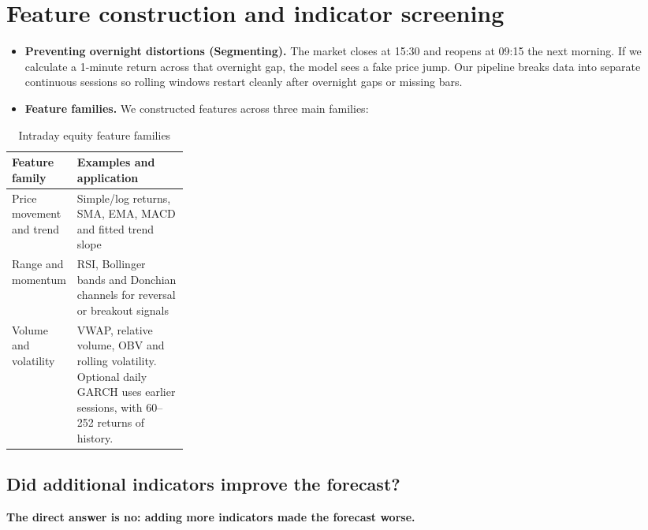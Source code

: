 \documentclass[12pt,a4paper,twoside,openany]{report}
\begin{document}
\section{Feature construction and indicator screening}\label{exp:5}
\begin{itemize}
  \item \textbf{Preventing overnight distortions (Segmenting).} The market closes at 15:30 and reopens at 09:15 the next morning. If we calculate a 1-minute return across that overnight gap, the model sees a fake price jump. Our pipeline breaks data into separate continuous sessions so rolling windows restart cleanly after overnight gaps or missing bars.
  \item \textbf{Feature families.} We constructed features across three main families:
\end{itemize}

\begin{table}[htbp]\centering\singlespacing
\caption{Intraday equity feature families}
\begin{tabularx}{\linewidth}{@{}p{0.26\linewidth}X@{}}\toprule
Feature family & Examples and application\\\midrule
Price movement and trend & Simple/log returns, SMA, EMA, MACD and fitted trend slope\\
Range and momentum & RSI, Bollinger bands and Donchian channels for reversal or breakout signals\\
Volume and volatility & VWAP, relative volume, OBV and rolling volatility. Optional daily GARCH uses earlier sessions, with 60--252 returns of history.\\
\bottomrule\end{tabularx}
\end{table}

\subsection*{Did additional indicators improve the forecast?}
\textbf{The direct answer is no: adding more indicators made the forecast worse.}
\end{document}
